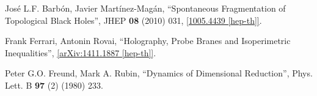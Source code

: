 \documentclass[12pt]{article}
\newcommand{\2}{$^2$}
\newcommand{\3}{$^3$}
\newcommand{\4}{$_4$}
\newcommand{\5}{$_5$}
\begin{document}
\begin{thebibliography}{400}
 Jos\'e L.F. Barb\'on, Javier Mart\'inez-Mag\'an, ``Spontaneous Fragmentation of Topological Black Holes'', JHEP \textbf{08} (2010) 031, \href{http://arxiv.org/abs/1005.4439}{[1005.4439 [hep-th]]}.

Frank Ferrari, Antonin Rovai, ``Holography, Probe Branes and Isoperimetric Inequalities'', \href{http://arxiv.org/abs/1411.1887}{[arXiv:1411.1887 [hep-th]]}.

Peter G.O. Freund, Mark A. Rubin, ``Dynamics of Dimensional Reduction'', Phys. Lett. B \textbf{97} (2) (1980) 233.



\end{thebibliography}
\end{document}
